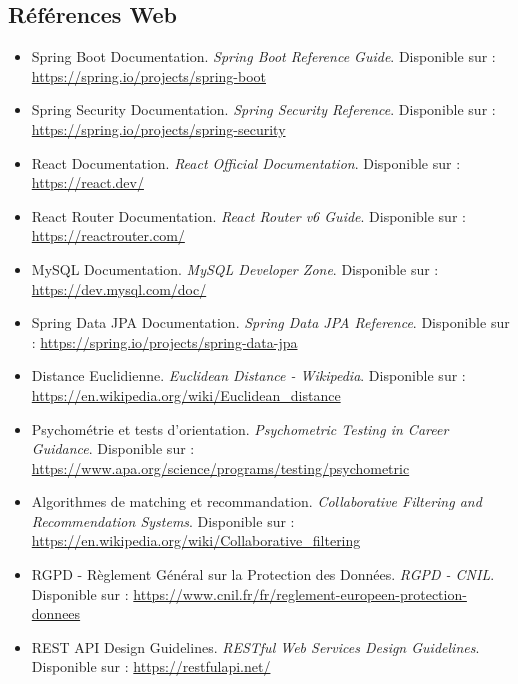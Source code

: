 \documentclass[12pt,a4paper]{report}
\begin{document}
\subsection{Références Web}

\begin{itemize}
    \item Spring Boot Documentation. \textit{Spring Boot Reference Guide}. Disponible sur : \url{https://spring.io/projects/spring-boot}
    
    \item Spring Security Documentation. \textit{Spring Security Reference}. Disponible sur : \url{https://spring.io/projects/spring-security}
    
    \item React Documentation. \textit{React Official Documentation}. Disponible sur : \url{https://react.dev/}
    
    \item React Router Documentation. \textit{React Router v6 Guide}. Disponible sur : \url{https://reactrouter.com/}
    
    \item MySQL Documentation. \textit{MySQL Developer Zone}. Disponible sur : \url{https://dev.mysql.com/doc/}
    
    \item Spring Data JPA Documentation. \textit{Spring Data JPA Reference}. Disponible sur : \url{https://spring.io/projects/spring-data-jpa}
   
    \item Distance Euclidienne. \textit{Euclidean Distance - Wikipedia}. Disponible sur : \url{https://en.wikipedia.org/wiki/Euclidean_distance}
    
    \item Psychométrie et tests d'orientation. \textit{Psychometric Testing in Career Guidance}. Disponible sur : \url{https://www.apa.org/science/programs/testing/psychometric}
    
    \item Algorithmes de matching et recommandation. \textit{Collaborative Filtering and Recommendation Systems}. Disponible sur : \url{https://en.wikipedia.org/wiki/Collaborative_filtering}
    
    \item RGPD - Règlement Général sur la Protection des Données. \textit{RGPD - CNIL}. Disponible sur : \url{https://www.cnil.fr/fr/reglement-europeen-protection-donnees}
    
    \item REST API Design Guidelines. \textit{RESTful Web Services Design Guidelines}. Disponible sur : \url{https://restfulapi.net/}
    

\end{itemize}
\end{document}
